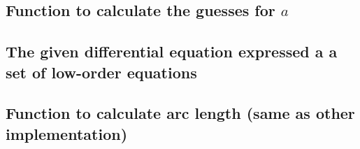 \documentclass{article}
\begin{document}
\subsection{Function to calculate the guesses for $a$}


\subsection{The given differential equation expressed a a set of low-order equations}


\subsection{Function to calculate arc length (same as other implementation)}

\end{document}
